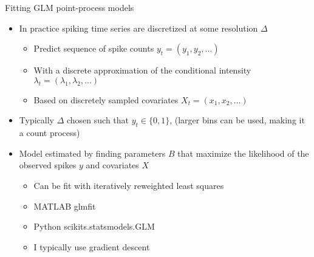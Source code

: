 \documentclass[svgnames,13pt]{beamer}
\begin{document}
\begin{frame}{Fitting GLM point-process models   }
\begin{itemize}
	\item <1->In practice spiking time series are discretized at some resolution $\Delta$
	\begin{itemize}
		\item <2->Predict sequence of spike counts $y_t=(y_1,y_2,...)$
		\item <3->With a discrete approximation of the conditional intensity $\lambda_t=(\lambda_1,\lambda_2,...)$
		\item <4->Based on discretely sampled covariates $X_t=(x_1,x_2,...)$
		\end{itemize}
	\item <5->Typically $\Delta$ chosen such that $y_t\in\{0,1\}$, (larger bins can be used, making it a count process)
	\item <6->Model estimated by finding parameters $B$ that maximize the likelihood of the observed spikes $y$ and covariates $X$
	\begin{itemize}
		\item <7->Can be fit with iteratively reweighted least squares 
		\item <8->MATLAB glmfit \\ \href{http://www.mathworks.com/help/stats/glmfit.html}{}
		\item <9->Python scikits.statsmodels.GLM \href{http://statsmodels.sourceforge.net/stable/glm.html}{} 
		\item <10->I typically use gradient descent
	\end{itemize}
\end{itemize}
\end{frame} 
\end{document}
